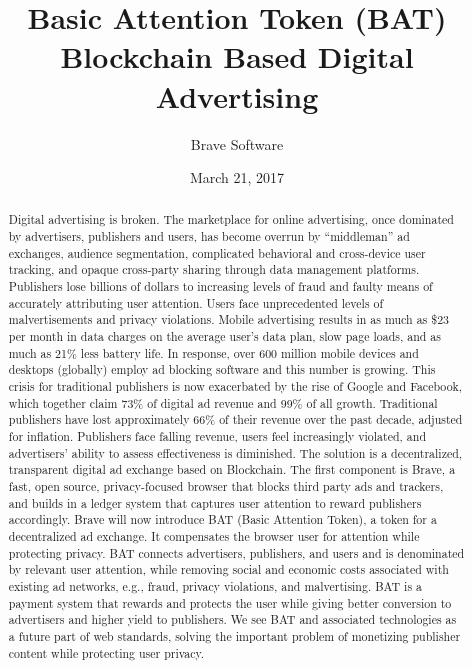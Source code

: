 \documentclass[11pt]{article}
\begin{document}
\title{%
Basic Attention Token (BAT) \\[1mm] 
\large Blockchain Based Digital Advertising}
\author{Brave Software}
\date{March 21, 2017}
\maketitle


\begin{abstract}
Digital advertising is broken. 
The marketplace for online advertising, once dominated by advertisers, publishers and users, has become overrun by ``middleman'' ad exchanges, audience segmentation, complicated behavioral and cross-device user tracking, and opaque cross-party sharing through data management platforms.
Publishers lose billions of dollars to increasing levels of fraud and faulty means of accurately attributing user attention. 
Users face unprecedented levels of malvertisements and privacy violations. Mobile advertising results in as much as \$23 per month in data charges on the average user's data plan, slow page loads, and as much as 21\% less battery life.  
In response, over 600 million mobile devices and desktops (globally) employ ad blocking software and this number is growing. 
This crisis for traditional publishers is now exacerbated by the rise of Google and Facebook, which together claim 73\% of digital ad revenue and 99\% of all growth. 
Traditional publishers have lost approximately 66\% of their revenue over the past decade, adjusted for inflation. 
Publishers face falling revenue, users feel increasingly violated, and advertisers' ability to assess effectiveness is diminished. 
The solution is a decentralized, transparent digital ad exchange based on Blockchain. 
The first component is Brave, a fast, open source, privacy-focused browser that blocks third party ads and trackers, and builds in a ledger system that captures user attention to  reward publishers accordingly. 
Brave will now introduce BAT (Basic Attention Token), a token for a decentralized ad exchange. It compensates the browser user for attention while protecting privacy.
BAT connects advertisers, publishers, and users and is denominated by relevant user attention, while removing social and economic costs associated with existing ad networks, e.g., fraud, privacy violations, and malvertising.
BAT is a payment system that rewards and protects the user while giving better conversion to advertisers and higher yield to publishers.
We see BAT and associated technologies as a future part of web standards, solving the important problem of monetizing publisher content while protecting user privacy. 

\end{abstract}
\pagebreak
\end{document}
